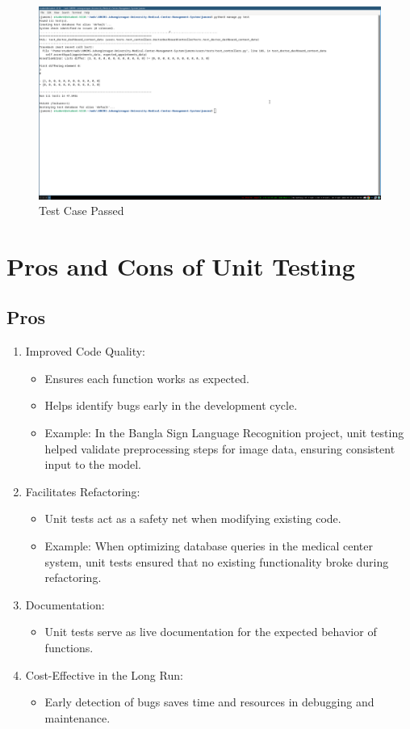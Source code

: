 \documentclass[a4paper,12pt]{article}
\begin{document}
\begin{figure}[H]
    \centering
    \includegraphics[width=1\textwidth]{images/test3.png}
    \caption{Test Case Passed}
    \label{fig:testupdatestock}
\end{figure}
\section{Pros and Cons of Unit Testing}
\subsection{Pros}
\begin{enumerate}
    \item Improved Code Quality:
        \begin{itemize}
            \item Ensures each function works as expected.
            \item Helps identify bugs early in the development cycle.
            \item Example: In the Bangla Sign Language Recognition project, unit testing helped validate preprocessing steps for image data, ensuring consistent input to the model.
        \end{itemize}
    \item Facilitates Refactoring:
        \begin{itemize}
            \item Unit tests act as a safety net when modifying existing code.
            \item Example: When optimizing database queries in the medical center system, unit tests ensured that no existing functionality broke during refactoring.
        \end{itemize}
    \item Documentation:
        \begin{itemize}
            \item Unit tests serve as live documentation for the expected behavior of functions.
        \end{itemize}

    \item Cost-Effective in the Long Run:
        \begin{itemize}
            \item Early detection of bugs saves time and resources in debugging and maintenance.
        \end{itemize}
\end{enumerate}
\end{document}
